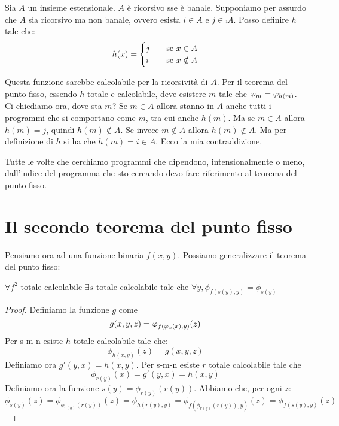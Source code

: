 Sia $A$ un insieme estensionale. $A$ è ricorsivo sse è banale. Supponiamo per assurdo che $A$ sia
ricorsivo ma non banale, ovvero esista $i \in A$ e $j \in \comp{A}$. Posso definire $h$ tale che:
\begin{equation*}
    h(x) = 
    \begin{cases}
        j \quad &\text{se $x \in A$}\\
        i \quad &\text{se $x \notin A$}
    \end{cases}
\end{equation*}

Questa funzione sarebbe calcolabile per la ricorsività di $A$. Per il teorema del punto fisso,
essendo $h$ totale e calcolabile, deve esistere $m$ tale che $\varphi_{m} = \varphi_{h(m)}$. Ci chiediamo ora,
dove sta $m$? Se $m \in A$ allora stanno in $A$ anche tutti i programmi che si comportano come $m$,
tra cui anche $h(m)$. Ma se $m \in A$ allora $h(m) = j$, quindi $h(m) \notin A$. Se invece $m \notin
A$ allora $h(m) \notin A$. Ma per definizione di $h$ si ha che $h(m) = i \in A$. Ecco la mia
contraddizione.

Tutte le volte che cerchiamo programmi che dipendono, intensionalmente o meno, dall'indice del
programma che sto cercando devo fare riferimento al teorema del punto fisso.

\section{Il secondo teorema del punto fisso}

Pensiamo ora ad una funzione binaria $f(x,y)$. Possiamo generalizzare il teorema del punto fisso:
\begin{thm}
    $\forall f^{2}$ totale calcolabile $\exists s$ totale calcolabile tale che $\forall y, \phi_{f(s(y),y)} = \phi_{s(y)}$
\end{thm}
\begin{proof}
    Definiamo la funzione $g$ come
    \begin{equation*}
         g(x,y,z) = \varphi_{f(\varphi_{x}(x),y)}(z)
    \end{equation*}
    Per s-m-n esiste $h$ totale calcolabile tale che:
    \begin{equation*}
        \phi_{h(x,y)}(z) = g(x,y,z)
    \end{equation*}
    Definiamo ora $g'(y,x) = h(x,y)$. Per s-m-n esiste $r$ totale calcolabile tale che
    \begin{equation*}
        \phi_{r(y)}(x) = g'(y,x) = h(x,y)
    \end{equation*}
    Definiamo ora la funzione $s(y) = \phi_{r(y)}(r(y))$. Abbiamo che, per ogni $z$:
    \begin{equation*}
        \phi_{s(y)}(z) = \phi_{\phi_{r(y)}(r(y))}(z) = \phi_{h(r(y),y)} =
        \phi_{f(\phi_{r(y)}(r(y)),y)}(z) = \phi_{f(s(y),y)}(z)
    \end{equation*}
\end{proof}
